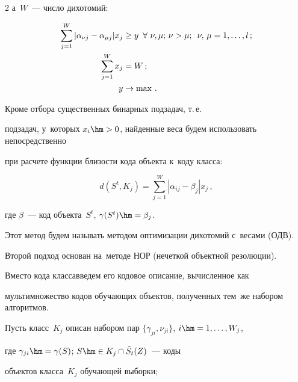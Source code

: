 \begin{multicols}{2}
а~$W$~--- число дихотомий:





\noindent


\begin{align*}


\sum\limits_{j = 1}^W {\left| \alpha _{\nu j} - \alpha _{\mu j} \right|} {x_j} &\ge y 


\enskip


 \forall\ \nu,\mu;\,\nu  > \mu;\enskip \nu,\,\mu  = 1,\ldots,l\,; \\


\sum\limits_{j = 1}^W {{x_j}} & = W\,; \\


y &\rightarrow  \max\,.


\end{align*}


Кроме отбора существенных бинарных подзадач, т.\,е.\


 подзадач, у~которых $x_i\hm>0$, найденные веса будем использовать непосредственно 


 при расчете функции близости кода объекта к~коду класса:


\begin{equation*}


d(S^t,K_j) = \sum\limits_{j = 1}^W {\left| {{\alpha _{i j}} - 


{\beta _{j}}} \right|} {x_j}\,,


\end{equation*}


где $\beta$~--- код объекта~$S^t$, $\gamma(S^t)\hm=\beta_j$.


Этот метод будем называть методом оптимизации дихотомий с~весами (ОДВ).





Второй подход основан на~методе НОР (нечеткой объектной резолюции).


Вместо кода класса\linebreak введем его кодовое описание, вычисленное как 


мультимножество кодов обучающих объектов, полученных тем~же набором алгоритмов.


Пусть класс~$K_j$ описан набором пар $\{\gamma_{ji}, \nu_{ji}\}$, $i\hm=1,\ldots,W_j$,


 где $\gamma_{ji}\hm=\gamma(S)$; $S\hm\in K_j\cap \tilde{S}_t(Z)$~--- коды 


 объектов класса~$K_j$ обучающей выборки;



\end{multicols}
